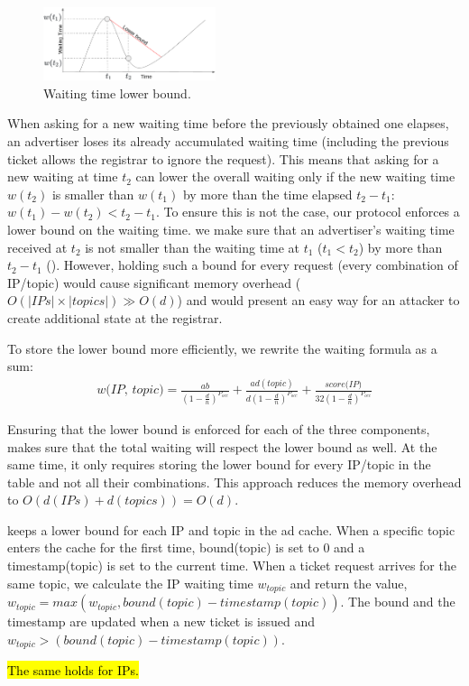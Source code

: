 \begin{figure}
    \includegraphics[width=0.45\textwidth]{img/lower_bound.png}
    \caption{Waiting time lower bound.}
    \label{fig:lower_bound}
\end{figure}

When asking for a new waiting time before the previously obtained one elapses,
an advertiser loses its already accumulated waiting time (including the previous ticket allows the registrar to ignore the request). This means that asking for a new waiting at time $t_2$ can lower the overall waiting only if
the new waiting time $w(t_2)$ is smaller than $w(t_1)$ by more than the time elapsed $t_2 - t_1$: $w(t_1) - w(t_2) < t_2 - t_1$.
To ensure this is not the case, our protocol enforces a lower bound on the
waiting time. \Ie we make sure that an advertiser's waiting time received at
$t_2$ is not smaller than the waiting time at $t_1$ ($t_1 < t_2$) by more than
$t_2 - t_1$ ().
However, holding such a bound for every request (\ie every combination of IP/topic) would cause significant memory overhead ($O(|IPs|\times|topics|) \gg O(d)$) and would present an easy way for an attacker to create additional state at the registrar. 

To store the lower bound more efficiently, we rewrite the waiting formula as a sum:
\begin{equation}
\begin{split}
    \textit{w(IP, topic)} = 
    \frac{ab}{(1-\frac{d}{n})^{P_\textit{occ}}} + \frac{ad(topic)}{d(1-\frac{d}{n})^{P_\textit{occ}}} + \frac{\textit{score(IP)}}{32(1-\frac{d}{n})^{P_\textit{occ}}}
\end{split}
\end{equation}


Ensuring that the lower bound is enforced for each of the three components, makes sure that the total waiting will respect the lower bound as well. At the same time, it only requires storing the lower bound for every IP/topic in the table and not all their combinations. This approach reduces the memory overhead to $O(d(IPs)+d(topics)) = O(d)$.

\sysname keeps a lower bound for each IP and topic in the ad cache. When a specific topic enters the cache for the first time, bound(topic) is set to 0 and a timestamp(topic) is set to the current time. When a ticket request arrives for the same topic, we calculate the IP waiting time $w_{\textit{topic}}$ and return the value, $w_{\textit{topic}} = \textit{max}(w_{\textit{topic}}, \textit{bound}(\textit{topic}) - \textit{timestamp}(\textit{topic}))$. The bound and the timestamp are updated when a new ticket is issued and $w_{\textit{topic}} > (\textit{bound}(\textit{topic}) - \textit{timestamp}(\textit{topic}))$. 

\hl{The same holds for IPs.}


